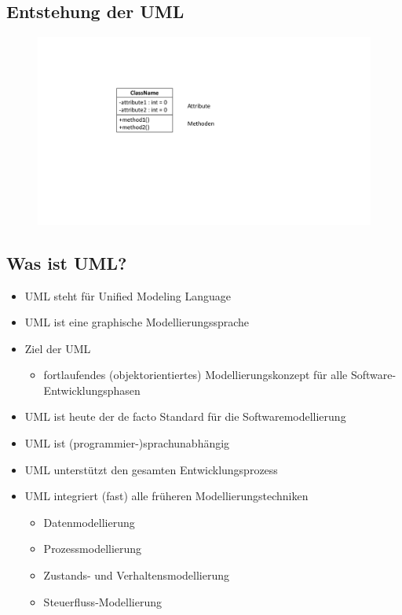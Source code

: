 \subsection{Entstehung der UML}
\label{sec:Entstehung der UML}
\begin{figure}[hh]
	\centering
	\includegraphics[width=0.5\linewidth]{images/klasse3.pdf}
\end{figure}

\subsection{Was ist UML?}
\label{sec:Was ist UML?}
\begin{itemize}
	\item UML steht für Unified Modeling Language
	\item UML ist eine graphische Modellierungssprache
	\item Ziel der UML
	\begin{itemize}
		\item fortlaufendes (objektorientiertes) Modellierungskonzept für alle Software-Entwicklungsphasen
	\end{itemize}
	\item UML ist heute der de facto Standard für die Softwaremodellierung
	\item UML ist (programmier-)sprachunabhängig
	\item UML unterstützt den gesamten Entwicklungsprozess
	\item UML integriert (fast) alle früheren Modellierungstechniken
	\begin{itemize}
		\item Datenmodellierung
		\item Prozessmodellierung
		\item Zustands- und Verhaltensmodellierung
		\item Steuerfluss-Modellierung
	\end{itemize}
\end{itemize}
\vspace{1cm}
